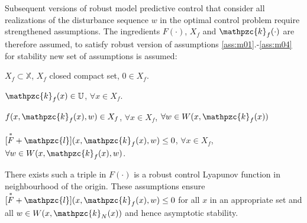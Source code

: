 Subsequent versions of robust model predictive control that consider all realizations of the disturbance sequence $w$ in the optimal control problem require strengthened assumptions. The ingredients $F(\cdot)$, $X_f$ and $\mathpzc{k}_f(\cdot)$ are therefore assumed, to satisfy robust version of assumptions \ref{ass:m01}.-\ref{ass:m04} for stability new set of assumptions is assumed:
\begin{assumption}{$X_f\subset\mathbb{X}$, $X_f$ closed compact set, $0 \in X_f$.}\label{ass:m01a}\end{assumption}
\begin{assumption}{$\mathpzc{k}_f(x)\in\mathbb{U}$, $\forall x \in X_f$.}\label{ass:m02a}\end{assumption}
\begin{assumption} {$f(x,\mathpzc{k}_f(x),w)\in X_f$, $\forall x \in X_f $, $\forall w\in W(x,\mathpzc{k}_f(x))$}\label{ass:m03a}\end{assumption}
\begin{assumption}{$[\overset{\ast}{F}+\mathpzc{l}](x,\mathpzc{k}_f(x),w)\le 0$, $\forall x \in X_f$, $\forall w \in W(x,\mathpzc{k}_f(x),w)$. }\label{ass:m04a}\end{assumption}
\noindent There exists such a triple in $F(\cdot)$ is a robust control Lyapunov function in neighbourhood of the origin. These assumptions ensure $[\overset{\ast}{F}+\mathpzc{l}](x,\mathpzc{k}_f(x),w)\le 0$ for  all $x$ in an appropriate set and all $w\in W(x,\mathpzc{k}_N(x))$ and hence asymptotic stability.

